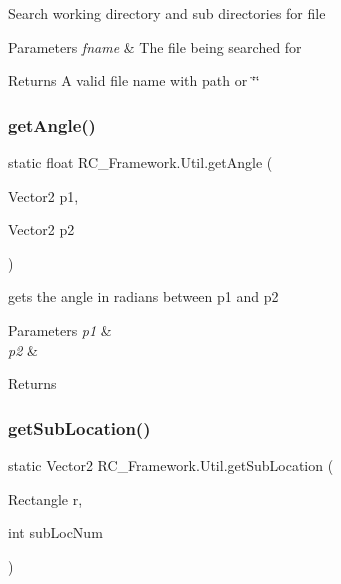 Search working directory and sub directories for file 


\begin{DoxyParams}{Parameters}
{\em fname} & The file being searched for\\
\hline
\end{DoxyParams}
\begin{DoxyReturn}{Returns}
A valid file name with path or \char`\"{}\char`\"{} 
\end{DoxyReturn}
\mbox{\label{class_r_c___framework_1_1_util_a9c9049464e895bda2a1fc9789c526ed2}} 
\subsubsection{\texorpdfstring{get\+Angle()}{getAngle()}}
{\footnotesize\ttfamily static float R\+C\+\_\+\+Framework.\+Util.\+get\+Angle (\begin{DoxyParamCaption}\item[{Vector2}]{p1,  }\item[{Vector2}]{p2 }\end{DoxyParamCaption})\hspace{0.3cm}{\ttfamily [static]}}



gets the angle in radians between p1 and p2 


\begin{DoxyParams}{Parameters}
{\em p1} & \\
\hline
{\em p2} & \\
\hline
\end{DoxyParams}
\begin{DoxyReturn}{Returns}

\end{DoxyReturn}
\mbox{\label{class_r_c___framework_1_1_util_ac1ae1f985062d114cae845a16df70c80}} 
\subsubsection{\texorpdfstring{get\+Sub\+Location()}{getSubLocation()}}
{\footnotesize\ttfamily static Vector2 R\+C\+\_\+\+Framework.\+Util.\+get\+Sub\+Location (\begin{DoxyParamCaption}\item[{Rectangle}]{r,  }\item[{int}]{sub\+Loc\+Num }\end{DoxyParamCaption})\hspace{0.3cm}{\ttfamily [static]}}



